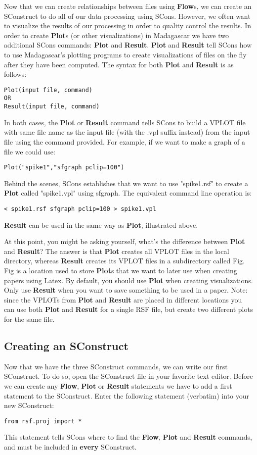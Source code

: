 Now that we can create relationships between files using \textbf{Flow}s, we can create an SConstruct to do all of our data processing using SCons.   However, we often want to visualize the results of our processing in order to quality control the results. In order to create \textbf{Plot}s (or other visualizations) in Madagascar we have two additional SCons commands:  \textbf{Plot} and \textbf{Result}.  \textbf{Plot} and \textbf{Result} tell SCons how to use Madagascar's plotting programs to create visualizations of files on the fly after they have been computed.  The syntax for both \textbf{Plot} and \textbf{Result} is as follows:
\begin{verbatim}
Plot(input file, command)
OR
Result(input file, command)
\end{verbatim}
In both cases, the \textbf{Plot} or \textbf{Result} command tells SCons to build a VPLOT file with same file name as the input file (with the .vpl suffix instead) from the input file using the command provided.  For example, if we want to make a graph of a file we could use:
\begin{verbatim}
Plot("spike1","sfgraph pclip=100")
\end{verbatim}
Behind the scenes, SCons establishes that we want to use "spike1.rsf" to create a \textbf{Plot} called "spike1.vpl" using sfgraph.  The equivalent command line operation is:
\begin{verbatim}
< spike1.rsf sfgraph pclip=100 > spike1.vpl
\end{verbatim}
\textbf{Result} can be used in the same way as \textbf{Plot}, illustrated above.  

At this point, you might be asking yourself, what's the difference between \textbf{Plot} and \textbf{Result}?  The answer is that \textbf{Plot} creates all VPLOT files in the local directory, whereas \textbf{Result} creates its VPLOT files in a subdirectory called Fig.  Fig is a location used to store \textbf{Plot}s that we want to later use when creating papers using Latex.  By default, you should use \textbf{Plot} when creating visualizations.  Only use \textbf{Result} when you want to save something to be used in a paper.  Note: since the VPLOTs from \textbf{Plot} and \textbf{Result} are placed in different locations you can use both \textbf{Plot} and \textbf{Result} for a single RSF file, but create two different plots for the same file.

\subsection{Creating an SConstruct}
Now that we have the three SConstruct commands, we can write our first SConstruct.  To do so, open the SConstruct file in your favorite text editor.  Before we can create any \textbf{Flow}, \textbf{Plot} or \textbf{Result} statements we have to add a first statement to the SConstruct.  Enter the following statement (verbatim) into your new SConstruct:
\begin{verbatim}
from rsf.proj import *
\end{verbatim}
This statement tells SCons where to find the \textbf{Flow}, \textbf{Plot} and \textbf{Result} commands, and must be included in \textbf{every} SConstruct.

